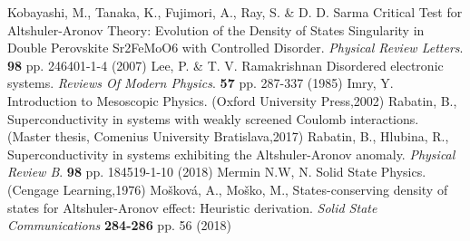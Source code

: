 \begin{thebibliography}{99}
Kobayashi, M., Tanaka, K., Fujimori, A., Ray, S. \& D. D. Sarma Critical Test for Altshuler-Aronov Theory: Evolution of the Density of States Singularity in Double Perovskite Sr2FeMoO6 with Controlled Disorder. {\em Physical Review Letters}. \textbf{98} pp. 246401-1-4 (2007)
Lee, P. \& T. V. Ramakrishnan Disordered electronic systems. {\em Reviews Of Modern Physics}. \textbf{57} pp. 287-337 (1985)
Imry, Y. Introduction to Mesoscopic Physics. (Oxford University Press,2002)
Rabatin, B., Superconductivity in systems with weakly screened Coulomb interactions. (Master thesis, Comenius University Bratislava,2017)
Rabatin, B., Hlubina, R.,  Superconductivity in systems exhibiting the Altshuler-Aronov anomaly. {\em Physical Review B}.  \textbf{98} pp. 184519-1-10 (2018)
Mermin N.W, N. Solid State Physics. (Cengage Learning,1976)
 Mošková, A., Moško, M.,  States-conserving density of states for Altshuler-Aronov effect: Heuristic derivation. {\em Solid State Communications  }  \textbf{284-286}   pp. 56 (2018)

  \end{thebibliography}